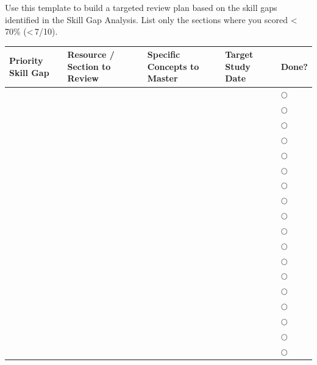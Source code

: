 \documentclass[11pt,letterpaper]{article}
\newcommand{\blank}[1][3cm]{\underline{\hspace{#1}}}
\begin{document}
\begin{planbox}

Use this template to build a targeted review plan based on the skill gaps identified in
the Skill Gap Analysis.  List only the sections where you scored \textless\,70\% (\textless\,7/10).

\vspace{0.4cm}

\begin{center}
\renewcommand{\arraystretch}{2.2}
\begin{longtable}{|p{3.0cm}|p{2.8cm}|p{2.8cm}|p{2.3cm}|p{1.9cm}|}
\hline
\textbf{Priority Skill Gap} & \textbf{Resource / Section to Review}
  & \textbf{Specific Concepts to Master} & \textbf{Target Study Date} & \textbf{Done?} \\
\hline
\endhead
\blank[3cm] & \blank[2.8cm] & \blank[2.8cm] & \blank[2.2cm] & $\bigcirc$ \\
\hline
\blank[3cm] & \blank[2.8cm] & \blank[2.8cm] & \blank[2.2cm] & $\bigcirc$ \\
\hline
\blank[3cm] & \blank[2.8cm] & \blank[2.8cm] & \blank[2.2cm] & $\bigcirc$ \\
\hline
\blank[3cm] & \blank[2.8cm] & \blank[2.8cm] & \blank[2.2cm] & $\bigcirc$ \\
\hline
\blank[3cm] & \blank[2.8cm] & \blank[2.8cm] & \blank[2.2cm] & $\bigcirc$ \\
\hline
\blank[3cm] & \blank[2.8cm] & \blank[2.8cm] & \blank[2.2cm] & $\bigcirc$ \\
\hline
\blank[3cm] & \blank[2.8cm] & \blank[2.8cm] & \blank[2.2cm] & $\bigcirc$ \\
\hline
\blank[3cm] & \blank[2.8cm] & \blank[2.8cm] & \blank[2.2cm] & $\bigcirc$ \\
\hline
\blank[3cm] & \blank[2.8cm] & \blank[2.8cm] & \blank[2.2cm] & $\bigcirc$ \\
\hline
\blank[3cm] & \blank[2.8cm] & \blank[2.8cm] & \blank[2.2cm] & $\bigcirc$ \\
\hline
\blank[3cm] & \blank[2.8cm] & \blank[2.8cm] & \blank[2.2cm] & $\bigcirc$ \\
\hline
\blank[3cm] & \blank[2.8cm] & \blank[2.8cm] & \blank[2.2cm] & $\bigcirc$ \\
\hline
\blank[3cm] & \blank[2.8cm] & \blank[2.8cm] & \blank[2.2cm] & $\bigcirc$ \\
\hline
\blank[3cm] & \blank[2.8cm] & \blank[2.8cm] & \blank[2.2cm] & $\bigcirc$ \\
\hline
\blank[3cm] & \blank[2.8cm] & \blank[2.8cm] & \blank[2.2cm] & $\bigcirc$ \\
\hline
\blank[3cm] & \blank[2.8cm] & \blank[2.8cm] & \blank[2.2cm] & $\bigcirc$ \\
\hline
\blank[3cm] & \blank[2.8cm] & \blank[2.8cm] & \blank[2.2cm] & $\bigcirc$ \\
\hline
\blank[3cm] & \blank[2.8cm] & \blank[2.8cm] & \blank[2.2cm] & $\bigcirc$ \\
\hline
\end{longtable}
\end{center}


\end{planbox}
\end{document}
